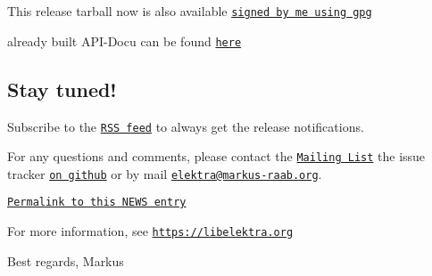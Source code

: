 This release tarball now is also available \href{https://www.libelektra.org/ftp/elektra/releases/elektra-0.8.16.tar.gz.gpg}{\tt signed by me using gpg}

already built A\+P\+I-\/\+Docu can be found \href{https://doc.libelektra.org/api/0.8.16/html/}{\tt here}

\subsection*{Stay tuned!}

Subscribe to the \href{https://doc.libelektra.org/news/feed.rss}{\tt R\+SS feed} to always get the release notifications.

For any questions and comments, please contact the \href{https://lists.sourceforge.net/lists/listinfo/registry-list}{\tt Mailing List} the issue tracker \href{https://git.libelektra.org/issues}{\tt on github} or by mail \href{mailto:elektra@markus-raab.org}{\tt elektra@markus-\/raab.\+org}.

\href{https://doc.libelektra.org/news/9c9247ee-ee9c-4f4a-a68e-76959def9b82.html}{\tt Permalink to this N\+E\+WS entry}

For more information, see \href{https://libelektra.org}{\tt https\+://libelektra.\+org}

Best regards, Markus 